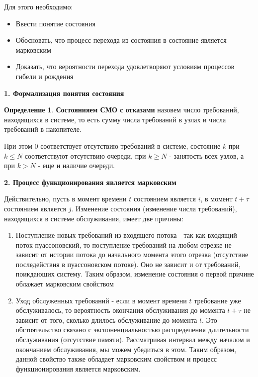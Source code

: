 \documentclass[aps,%
12pt,%
final,%
oneside,
onecolumn,%
musixtex, %
superscriptaddress,%
centertags]{article} %
\theoremstyle{plain}
\theoremstyle{definition}
\newtheorem{definition}{Определение}[subsection]
\theoremstyle{remark}
\begin{document}
Для этого необходимо:

\begin{itemize}
	\item Ввести понятие состояния
	\item Обосновать, что процесс перехода из состояния в состояние является марковским 
	\item Доказать, что вероятности перехода удовлетворяют условиям процессов гибели и рождения
\end{itemize}

\textbf{1. Формализация понятия состояния}

\begin{definition}
	\textbf{Состоянияем СМО с отказами} назовем число требований, находящихся в системе, то есть сумму числа требований в узлах и числа требований в накопителе.

	При этом $0$ соответствует отсутствию требований в системе, состояние $k$ при $k \leq N$ соответствуют отсутствию очереди, при $k \geq N$ - занятость всех узлов, а при $k > N$ - еще и наличие очереди.
\end{definition}

\textbf{2. Процесс функционирования является марковским}

Действительно, пусть в момент времени $t$ состоянием является $i$, в момент $t + \tau$ состоянием является $j$. Изменение состояния (изменение числа требований), находящихся в системе обслуживания, имеет две причины:
\begin{enumerate}
	\item Поступление новых требований из входящего потока - так как входящий поток пуассоновский, то поступление требований на любом отрезке не зависит от истории потока до начального момента этого отрезка (отсутствие последействия в пуассоновском потоке). Оно не зависит и от требований, поикдающих систему. Таким образом, изменение состояния о первой причине облажает марковским свойством
	\item Уход обслуженных требований - если в момент времени $t$ требование уже обслуживалось, то вероятность окончания обслуживания до момента $t + \tau$ не зависит от того, сколько длилось обслуживание до момента $t$. Это обстоятельство связано с экспоненциальностью распределения длительности обслуживания (отсутствие памяти). Рассматривая интервал между началом и окончанием обслуживания, мы можем убедиться в этом. Таким образом, данной свойство также обладает марковским свойством и процесс функционирования является марковским.
\end{enumerate}
\end{document}
